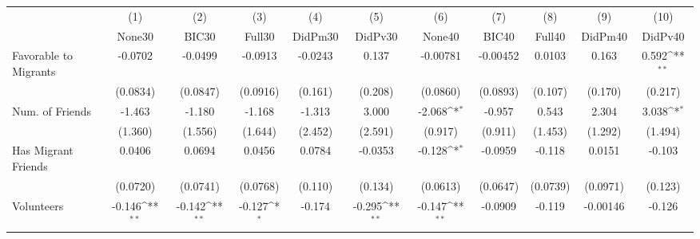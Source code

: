 {
\def\sym#1{\ifmmode^{#1}\else\(^{#1}\)\fi}
\begin{tabular}{l*{10}{c}}
\toprule
            &\multicolumn{1}{c}{(1)}&\multicolumn{1}{c}{(2)}&\multicolumn{1}{c}{(3)}&\multicolumn{1}{c}{(4)}&\multicolumn{1}{c}{(5)}&\multicolumn{1}{c}{(6)}&\multicolumn{1}{c}{(7)}&\multicolumn{1}{c}{(8)}&\multicolumn{1}{c}{(9)}&\multicolumn{1}{c}{(10)}\\
            &\multicolumn{1}{c}{None30}&\multicolumn{1}{c}{BIC30}&\multicolumn{1}{c}{Full30}&\multicolumn{1}{c}{DidPm30}&\multicolumn{1}{c}{DidPv30}&\multicolumn{1}{c}{None40}&\multicolumn{1}{c}{BIC40}&\multicolumn{1}{c}{Full40}&\multicolumn{1}{c}{DidPm40}&\multicolumn{1}{c}{DidPv40}\\
\midrule
Favorable to Migrants&     -0.0702         &     -0.0499         &     -0.0913         &     -0.0243         &       0.137         &    -0.00781         &    -0.00452         &      0.0103         &       0.163         &       0.592\sym{**} \\
            &    (0.0834)         &    (0.0847)         &    (0.0916)         &     (0.161)         &     (0.208)         &    (0.0860)         &    (0.0893)         &     (0.107)         &     (0.170)         &     (0.217)         \\
\addlinespace
Num. of Friends&      -1.463         &      -1.180         &      -1.168         &      -1.313         &       3.000         &      -2.068\sym{*}  &      -0.957         &       0.543         &       2.304         &       3.038\sym{*}  \\
            &     (1.360)         &     (1.556)         &     (1.644)         &     (2.452)         &     (2.591)         &     (0.917)         &     (0.911)         &     (1.453)         &     (1.292)         &     (1.494)         \\
\addlinespace
Has Migrant Friends&      0.0406         &      0.0694         &      0.0456         &      0.0784         &     -0.0353         &      -0.128\sym{*}  &     -0.0959         &      -0.118         &      0.0151         &      -0.103         \\
            &    (0.0720)         &    (0.0741)         &    (0.0768)         &     (0.110)         &     (0.134)         &    (0.0613)         &    (0.0647)         &    (0.0739)         &    (0.0971)         &     (0.123)         \\
\addlinespace
Volunteers  &      -0.146\sym{**} &      -0.142\sym{**} &      -0.127\sym{*}  &      -0.174         &      -0.295\sym{**} &      -0.147\sym{**} &     -0.0909         &      -0.119         &    -0.00146         &      -0.126         \\

\end{tabular}}

